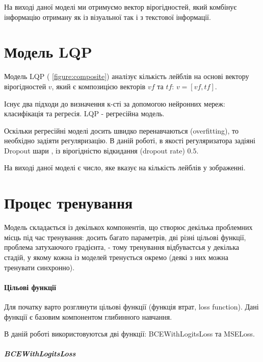 \documentclass{udstu}
\begin{document}
На виході даної моделі ми отримуємо вектор вірогідностей, який комбінує інформацію отриману як із візуальної так і з
текстової інформації.


\section{Модель LQP}

Модель LQP (\figurename{ \ref{figure:composite}}) аналізує кількість лейблів на основі вектору вірогідностей $v$,
який є композицією векторів $vf$ та $tf$: $v = [vf, tf]$.

Існує два підходи до визначення к-сті за допомогою нейронних мереж: класифікація та регресія.
LQP - регресійна модель.

Оскільки регресійні моделі досить швидко перенавчаються (overfitting), то необхідно задіяти регуляризацію.
В даній роботі, в якості регуляризатора задіяні Dropout шари \cite{dropout}, із вірогідністю відкидання (dropout rate) $0.5$.

На виході даної моделі є число, яке вказує на кількість лейблів у зображенні.


\section{Процес тренування}

Модель складається із декількох компонентів, що створює декілька проблемних місць під час тренування:
досить багато параметрів, дві різні цільові функції, проблема затухаючого градієнта, -
тому тренування відбуваєтсья у декілька стадій, у якому кожна із моделей тренується окремо
(деякі з них можна тренувати синхронно).


\paragraph{\textbf{Цільові функції}\\}

Для початку варто розглянути цільові функції (функція втрат, loss function).
Дані функції є базовим компонентом глибинного навчання.

В даній роботі використовуютсья дві функції: BCEWithLogitsLoss та MSELoss.

\paragraph{\textit{BCEWithLogitsLoss}\\}
\end{document}
